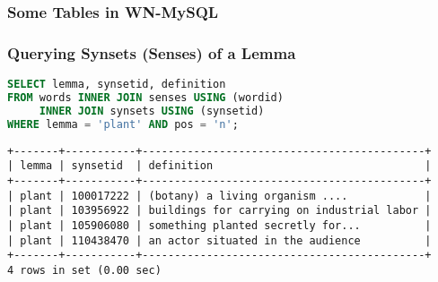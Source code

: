 \begin{frame}[fragile]
\frametitle{Some Tables in WN-MySQL}
    

\end{frame}

\begin{frame}[fragile]
\frametitle{Querying Synsets (Senses) of a Lemma}
    
\begin{lstlisting}[language=SQL]
SELECT lemma, synsetid, definition
FROM words INNER JOIN senses USING (wordid)
     INNER JOIN synsets USING (synsetid)
WHERE lemma = 'plant' AND pos = 'n';
\end{lstlisting}

\begin{lstlisting}[basicstyle=\ttfamily\scriptsize,columns=fixed]
+-------+-----------+--------------------------------------------+
| lemma | synsetid  | definition                                 |
+-------+-----------+--------------------------------------------+
| plant | 100017222 | (botany) a living organism ....            |
| plant | 103956922 | buildings for carrying on industrial labor |
| plant | 105906080 | something planted secretly for...          |
| plant | 110438470 | an actor situated in the audience          |
+-------+-----------+--------------------------------------------+
4 rows in set (0.00 sec)
\end{lstlisting}

\end{frame}


